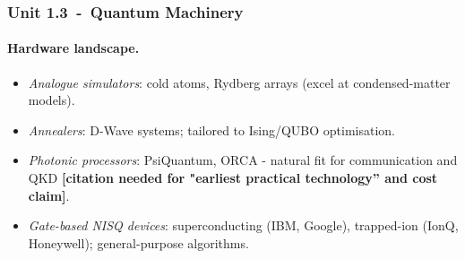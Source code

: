 


\subsubsection*{Unit 1.3 - Quantum Machinery}
\paragraph{Hardware landscape.}
\begin{itemize}
	\item \emph{Analogue simulators}: cold atoms, Rydberg arrays (excel at condensed-matter models).
	\item \emph{Annealers}: D-Wave systems; tailored to Ising/QUBO optimisation.
	\item \emph{Photonic processors}: PsiQuantum, ORCA - natural fit for communication and QKD%
	\cite{ORCA:2022}\textbf{[citation needed for "earliest practical technology” and cost claim]}.
	\item \emph{Gate-based NISQ devices}: superconducting (IBM, Google), trapped-ion (IonQ, Honeywell); general-purpose algorithms.
\end{itemize}

